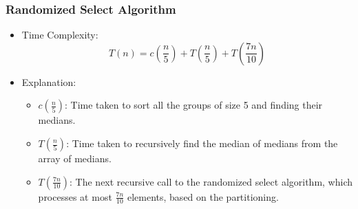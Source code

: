 \begin{frame}
    \frametitle{Randomized Select Algorithm}
    \begin{itemize}
        \item Time Complexity:
        \[
        T(n) = c\left(\frac{n}{5}\right) + T\left(\frac{n}{5}\right) + T\left(\frac{7n}{10}\right)
        \]
        \item Explanation:
        \begin{itemize}
            \item \(c\left(\frac{n}{5}\right)\): Time taken to sort all the groups of size 5 and finding their medians.
            \vspace{0.4cm}
            \item \(T\left(\frac{n}{5}\right)\): Time taken to recursively find the median of medians from the array of medians.
            \vspace{0.2cm}
            \item \(T\left(\frac{7n}{10}\right)\): The next recursive call to the randomized select algorithm, which processes at most \( \frac{7n}{10} \) elements, based on the partitioning.
        \end{itemize}
        
    \end{itemize}
\end{frame}
